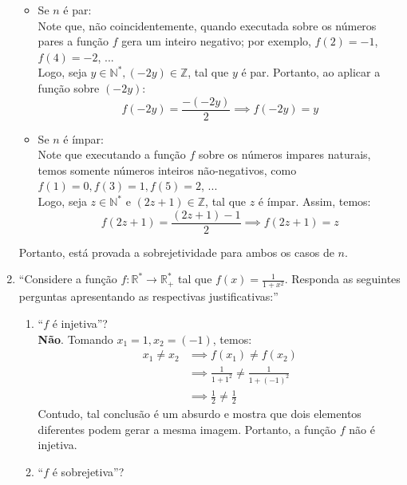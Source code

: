 \documentclass[13pt,letterpaper]{article}
\begin{document}
\begin{enumerate}
        \begin{itemize}
            \item Se $n$ é par: \\
            Note que, não coincidentemente, quando executada sobre os números pares a função $f$ gera um inteiro negativo; por exemplo, $f(2) = -1$, $f(4) = -2$, ... \\
            Logo, seja $y \in \mathbb{N}^*, (-2y) \in \mathbb{Z}$, tal que $y$ é par. Portanto, ao aplicar a função sobre $(-2y)$:
            \begin{displaymath}
                f(-2y) = \frac{-(-2y)}{2} \implies f(-2y) = y
            \end{displaymath}
            \item Se $n$ é ímpar: \\
            Note que executando a função $f$ sobre os números impares naturais, temos somente números inteiros não-negativos, como $f(1) = 0, f(3) = 1, f(5) = 2$, ... \\
            Logo, seja $z \in \mathbb{N}^*$ e $(2z + 1) \in \mathbb{Z}$, tal que $z$ é ímpar. Assim, temos:
            \begin{displaymath}
                f(2z + 1) = \frac{(2z + 1) - 1}{2} \implies f(2z + 1) = z
            \end{displaymath}
        \end{itemize}
        Portanto, está provada a sobrejetividade para ambos os casos de $n$.
    \item \enquote{Considere a função $f: \mathbb{R}^* \rightarrow \mathbb{R}^*_+$ tal que $f(x) = \frac{1}{1 + x^2}$. Responda as seguintes perguntas apresentando as respectivas justificativas:}
    \begin{enumerate}
        \item \enquote{$f$ é injetiva}? \\
        \textbf{Não}. Tomando $x_1 = 1, x_2 = (-1)$, temos:
        \begin{align*}
            x_1 \ne x_2 &\implies f(x_1) \ne f(x_2) \\ &\implies 
            \frac{1}{1 + 1^2} \ne \frac{1}{1 + (-1)^2} \\ &\implies
            \frac{1}{2} \ne \frac{1}{2}
        \end{align*}
        Contudo, tal conclusão é um absurdo e mostra que dois elementos diferentes podem gerar a mesma imagem. Portanto, a função $f$ não é injetiva.
        \item \enquote{$f$ é sobrejetiva}? \\

\end{enumerate}
\end{enumerate}
\end{document}
